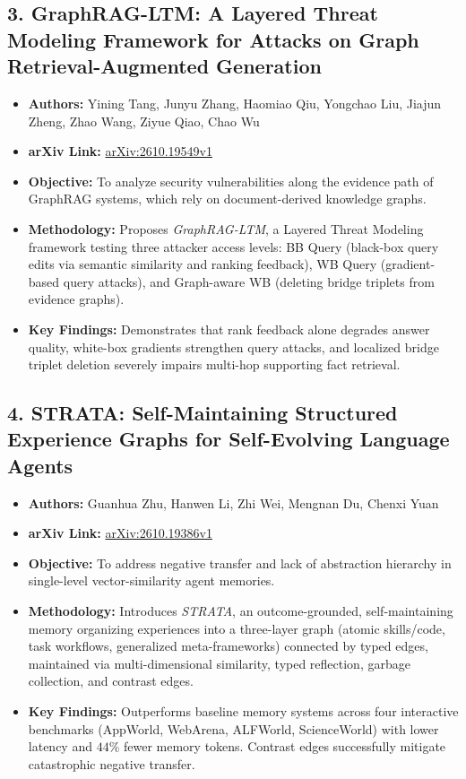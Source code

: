 \documentclass[11pt,a4paper]{article}
\begin{document}
\subsection{3. GraphRAG-LTM: A Layered Threat Modeling Framework for Attacks on Graph Retrieval-Augmented Generation}
\begin{itemize}
    \item \textbf{Authors:} Yining Tang, Junyu Zhang, Haomiao Qiu, Yongchao Liu, Jiajun Zheng, Zhao Wang, Ziyue Qiao, Chao Wu \cite{tang2026graphragltm}
    \item \textbf{arXiv Link:} \href{http://arxiv.org/abs/2610.19549v1}{arXiv:2610.19549v1}
    \item \textbf{Objective:} To analyze security vulnerabilities along the evidence path of GraphRAG systems, which rely on document-derived knowledge graphs.
    \item \textbf{Methodology:} Proposes \textit{GraphRAG-LTM}, a Layered Threat Modeling framework testing three attacker access levels: BB Query (black-box query edits via semantic similarity and ranking feedback), WB Query (gradient-based query attacks), and Graph-aware WB (deleting bridge triplets from evidence graphs).
    \item \textbf{Key Findings:} Demonstrates that rank feedback alone degrades answer quality, white-box gradients strengthen query attacks, and localized bridge triplet deletion severely impairs multi-hop supporting fact retrieval.
\end{itemize}

\subsection{4. STRATA: Self-Maintaining Structured Experience Graphs for Self-Evolving Language Agents}
\begin{itemize}
    \item \textbf{Authors:} Guanhua Zhu, Hanwen Li, Zhi Wei, Mengnan Du, Chenxi Yuan \cite{zhu2026strata}
    \item \textbf{arXiv Link:} \href{http://arxiv.org/abs/2610.19386v1}{arXiv:2610.19386v1}
    \item \textbf{Objective:} To address negative transfer and lack of abstraction hierarchy in single-level vector-similarity agent memories.
    \item \textbf{Methodology:} Introduces \textit{STRATA}, an outcome-grounded, self-maintaining memory organizing experiences into a three-layer graph (atomic skills/code, task workflows, generalized meta-frameworks) connected by typed edges, maintained via multi-dimensional similarity, typed reflection, garbage collection, and contrast edges.
    \item \textbf{Key Findings:} Outperforms baseline memory systems across four interactive benchmarks (AppWorld, WebArena, ALFWorld, ScienceWorld) with lower latency and $44\%$ fewer memory tokens. Contrast edges successfully mitigate catastrophic negative transfer.
\end{itemize}
\end{document}
